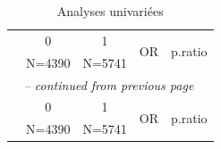 \documentclass{book}
\begin{document}
\newpage

    \begin{longtable}{lcccc}\caption{Analyses univariées}\\
    \hline  
     &      0       &      1       & \multirow{2}{*}{       OR       } & \multirow{2}{*}{p.ratio}\\ 
 &    N=4390    &    N=5741    &                  &         \\ 
  
    \hline
    \hline     
    \endfirsthead 
    \multicolumn{5}{l}{\tablename\ \thetable{} \textit{-- continued from previous page}}\\ 
    \hline
     &      0       &      1       & \multirow{2}{*}{       OR       } & \multirow{2}{*}{p.ratio}\\ 
 &    N=4390    &    N=5741    &                  &         \\ 


\end{longtable}
\end{document}
